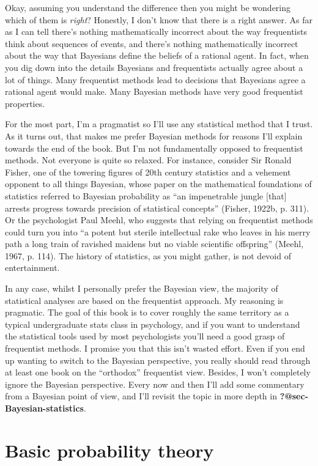 \documentclass[
  a4paper,
]{book}
\begin{document}
Okay, assuming you understand the difference then you might be wondering
which of them is \emph{right}? Honestly, I don't know that there is a
right answer. As far as I can tell there's nothing mathematically
incorrect about the way frequentists think about sequences of events,
and there's nothing mathematically incorrect about the way that
Bayesians define the beliefs of a rational agent. In fact, when you dig
down into the details Bayesians and frequentists actually agree about a
lot of things. Many frequentist methods lead to decisions that Bayesians
agree a rational agent would make. Many Bayesian methods have very good
frequentist properties.

For the most part, I'm a pragmatist so I'll use any statistical method
that I trust. As it turns out, that makes me prefer Bayesian methods for
reasons I'll explain towards the end of the book. But I'm not
fundamentally opposed to frequentist methods. Not everyone is quite so
relaxed. For instance, consider Sir Ronald Fisher, one of the towering
figures of 20th century statistics and a vehement opponent to all things
Bayesian, whose paper on the mathematical foundations of statistics
referred to Bayesian probability as ``an impenetrable jungle {[}that{]}
arrests progress towards precision of statistical concepts'' (Fisher,
1922b, p. 311). Or the psychologist Paul Meehl, who suggests that
relying on frequentist methods could turn you into ``a potent but
sterile intellectual rake who leaves in his merry path a long train of
ravished maidens but no viable scientific offspring'' (Meehl, 1967, p.
114). The history of statistics, as you might gather, is not devoid of
entertainment.

In any case, whilst I personally prefer the Bayesian view, the majority
of statistical analyses are based on the frequentist approach. My
reasoning is pragmatic. The goal of this book is to cover roughly the
same territory as a typical undergraduate stats class in psychology, and
if you want to understand the statistical tools used by most
psychologists you'll need a good grasp of frequentist methods. I promise
you that this isn't wasted effort. Even if you end up wanting to switch
to the Bayesian perspective, you really should read through at least one
book on the ``orthodox'' frequentist view. Besides, I won't completely
ignore the Bayesian perspective. Every now and then I'll add some
commentary from a Bayesian point of view, and I'll revisit the topic in
more depth in \textbf{?@sec-Bayesian-statistics}.

\hypertarget{basic-probability-theory}{%
\section{Basic probability theory}\label{basic-probability-theory}}
\end{document}
